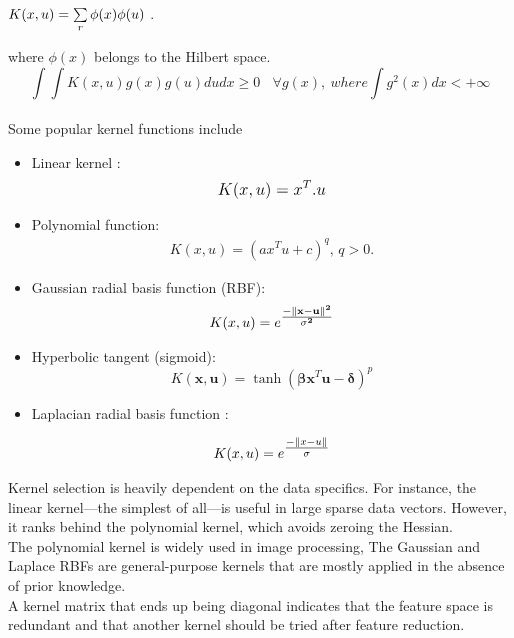 $K(\small{x,u})=\sum\limits_{r} \phi(x)\phi(u) $ .

where $\phi(x) $ belongs to the Hilbert space.
\newline
$$\int \int K(x,u) g(x) g(u) du dx \geq 0 \ \ \ \ \forall g(x) , \ where \int g^2(x) dx < +\infty$$
\\
\newline 
Some popular kernel functions include


\begin{itemize}

  \item  Linear kernel  : 
  \begin{align*}
  \mathlarger {K(x,u)=  x^{T}.u  }
   \end{align*}
  \item Polynomial function: 
  \begin{align*}
  K(x,u)=(ax^{T}u + c)^{q} ,\, q>0.
  \end{align*}
  \item Gaussian radial basis function (RBF): 
\begin{align*} 
 K(x,u) = e^{\mathlarger{\frac{\mathbf{-\| x -  u\|^2}}{\mathbf{\sigma^2} } }}
\end{align*}
   
  \item  Hyperbolic tangent (sigmoid):
    \begin{equation}
      K(\mathbf x, \mathbf u) = \tanh(\mathbf {\beta} \mathbf x^{T} \mathbf u - \mathbf{\delta})^p
    \end{equation}
    
    \item Laplacian radial basis function : 
    
    \begin{align*} 
      K(x,u) = e^{\mathlarger{\frac{-\| x -  u\|}{\sigma} } }
     \end{align*}
    
\end{itemize}

Kernel selection is heavily dependent on the data specifics. For instance, the linear kernel—the simplest
of all—is useful in large sparse data vectors. However, it ranks behind the polynomial kernel, which avoids
zeroing the Hessian. \\The polynomial kernel is widely used in image processing, The Gaussian and Laplace RBFs are general-purpose kernels
that are mostly applied in the absence of prior knowledge. \\A kernel matrix that ends up being diagonal indicates that the feature space is redundant and that another kernel should be tried after feature reduction.\\

